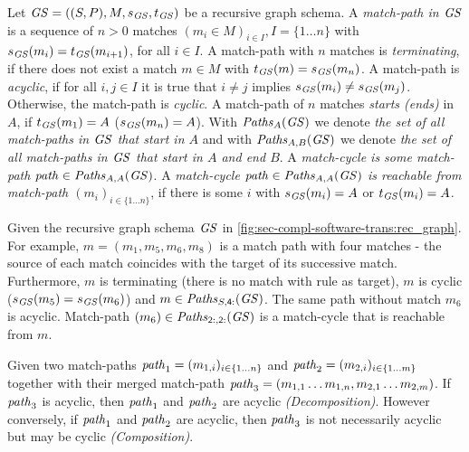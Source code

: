 \begin{definition}
\label{def:sec-compl-software-trans:c_t_match-path}
Let $\mathit{GS}=((S,P),M,s_\mathit{GS},t_\mathit{GS})$ be a recursive graph schema.
A \emph{match-path in $\mathit{GS}$} is a sequence of $n>0$ matches $(m_i \in M)_{i \in I},I=\{1 \ldots n\}$ with $s_\mathit{GS}(m_i)=t_\mathit{GS}(m_{i+1})$, for all $i \in I$.
A match-path with $n$ matches is \emph{terminating}, if there does not exist a match $m \in M$ with $t_\mathit{GS}(m)=s_\mathit{GS}(m_n)$.
A match-path is \emph{acyclic}, if for all $i,j \in I$ it is true that $i \neq j$ implies $s_\mathit{GS}(m_i) \neq s_\mathit{GS}(m_j)$.
Otherwise, the match-path is \emph{cyclic}.
A match-path of $n$ matches \emph{starts (ends)} in $A$, if $t_\mathit{GS}(m_1)=A$ ($s_\mathit{GS}(m_n)=A$).
With $\mathit{Paths}_A(\mathit{GS})$ we denote \emph{the set of all match-paths in $\mathit{GS}$ that start in $A$} and with $\mathit{Paths}_{A,B}(\mathit{GS})$ we denote \emph{the set of all match-paths in $\mathit{GS}$ that start in $A$ and end $B$}.
A \emph{match-cycle is some match-path $\mathit{path} \in \mathit{Paths}_{A,A}(\mathit{GS})$}.
A \emph{match-cycle $\mathit{path} \in \mathit{Paths}_{A,A}(\mathit{GS})$ is reachable from match-path $(m_i)_{i \in \{1\ldots n\}}$}, if there is some $i$ with $s_\mathit{GS}(m_i)=A$ or $t_\mathit{GS}(m_i)=A$.
\envEndMarker
\end{definition}

\begin{example}
Given the recursive graph schema $\mathit{GS}$ in \cref{fig:sec-compl-software-trans:rec_graph}.
For example, $m=(m_1,m_5,m_6,m_8)$ is a match path with four matches - the source of each match coincides with the target of its successive match.
Furthermore, $m$ is terminating (there is no match with rule  as target), $m$ is cyclic ($s_\mathit{GS}(m_5)=s_\mathit{GS}(m_6)$) and $m \in \mathit{Paths}_{S,\mathsf{4:}}(\mathit{GS})$.
The same path without match $m_6$ is acyclic.
Match-path $(m_6) \in \mathit{Paths}_{\mathsf{2:},\mathsf{2:}}(\mathit{GS})$ is a match-cycle that is reachable from $m$.
\envEndMarker
\end{example}

\begin{proposition}
\label{prop:sec-compl-software-trans:decomp_acyclic_match-paths}
Given two match-paths $\mathit{path}_1=(m_{1,i})_{i \in \{1\ldots n\}}$ and $\mathit{path}_2=(m_{2,i})_{i \in \{1\ldots m\}}$ together with their merged match-path $\mathit{path}_3=(m_{1,1}\ldots m_{1,n},m_{2,1}\ldots m_{2,m})$.
If $\mathit{path}_3$ is acyclic, then $\mathit{path}_1$ and $\mathit{path}_2$ are acyclic \emph{(Decomposition)}.
However conversely, if $\mathit{path}_1$ and $\mathit{path}_2$ are acyclic, then $\mathit{path}_3$ is not necessarily acyclic but may be cyclic \emph{(Composition)}.
\envEndMarker
\end{proposition}

